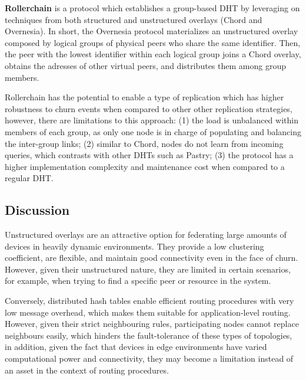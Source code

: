 \textbf{Rollerchain} \cite{rollerchain} is a protocol which establishes a group-based DHT by leveraging on techniques from both structured and unstructured  overlays (Chord and Overnesia). In short, the Overnesia protocol materializes an unstructured overlay composed by logical groups of physical peers who share the same identifier. Then, the peer with the lowest identifier within each logical group joins a Chord overlay, obtains the adresses of other virtual peers, and distributes them among group members.

Rollerchain has the potential to enable a type of replication which has higher robustness to churn events when compared to other other replication strategies, however, there are limitations to this approach: (1) the load is unbalanced within members of each group, as only one node is in charge of populating and balancing the inter-group links; (2) similar to Chord, nodes do not learn from incoming queries, which contrasts with other DHTs such as Pastry; (3) the protocol has a higher implementation complexity and maintenance cost when compared to a regular DHT.

\subsection{Discussion}

Unstructured overlays are an attractive option for federating large amounts of devices in heavily dynamic environments. They provide a low clustering coefficient, are flexible, and maintain good connectivity even in the face of churn. However, given their unstructured nature, they are limited in certain scenarios, for example, when trying to find a specific peer or resource in the system.

Conversely, distributed hash tables enable efficient routing procedures with very low message overhead, which makes them suitable for application-level routing. However, given their strict neighbouring rules, participating nodes cannot replace neighbours easily, which hinders the fault-tolerance of these types of topologies, in addition, given the fact that devices in edge environments have varied computational power and connectivity, they may become a limitation instead of an asset in the context of routing procedures. 


